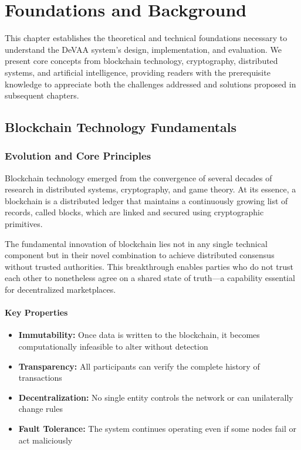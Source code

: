 \chapter{Foundations and Background}
\label{chap:foundations}

This chapter establishes the theoretical and technical foundations necessary to understand the DeVAA system's design, implementation, and evaluation. We present core concepts from blockchain technology, cryptography, distributed systems, and artificial intelligence, providing readers with the prerequisite knowledge to appreciate both the challenges addressed and solutions proposed in subsequent chapters.

\section{Blockchain Technology Fundamentals}

\subsection{Evolution and Core Principles}

Blockchain technology emerged from the convergence of several decades of research in distributed systems, cryptography, and game theory. At its essence, a blockchain is a distributed ledger that maintains a continuously growing list of records, called blocks, which are linked and secured using cryptographic primitives.

The fundamental innovation of blockchain lies not in any single technical component but in their novel combination to achieve distributed consensus without trusted authorities. This breakthrough enables parties who do not trust each other to nonetheless agree on a shared state of truth—a capability essential for decentralized marketplaces.

\subsubsection{Key Properties}
\begin{itemize}
    \item \textbf{Immutability:} Once data is written to the blockchain, it becomes computationally infeasible to alter without detection
    \item \textbf{Transparency:} All participants can verify the complete history of transactions
    \item \textbf{Decentralization:} No single entity controls the network or can unilaterally change rules
    \item \textbf{Fault Tolerance:} The system continues operating even if some nodes fail or act maliciously
\end{itemize}


